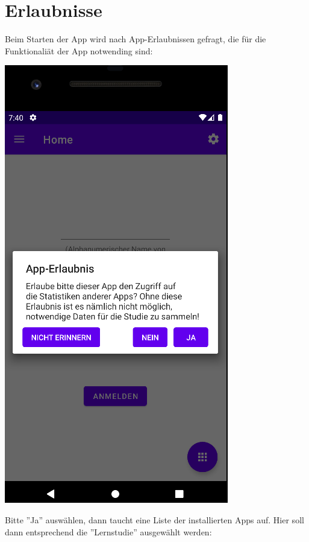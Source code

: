 \documentclass{article}
\begin{document}
\section{Erlaubnisse}
Beim Starten der App wird nach App-Erlaubnissen gefragt, die für die Funktionaliät der App notwending sind:
\begin{center}
    \includegraphics[scale=0.4]{start_per.png}
\end{center}
Bitte ''Ja'' auswählen, dann taucht eine Liste der installierten Apps auf. Hier soll dann entsprechend die ''Lernstudie'' ausgewählt werden:
\end{document}
